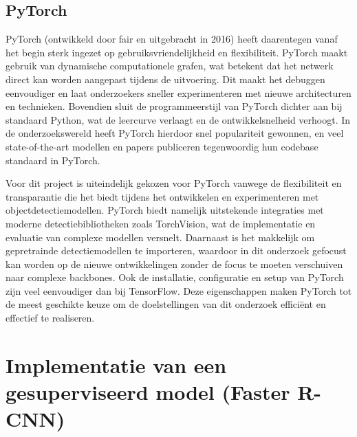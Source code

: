 \subsection{PyTorch}

PyTorch (ontwikkeld door \gls{fair} en uitgebracht in 2016) heeft daarentegen vanaf het begin sterk ingezet op gebruiksvriendelijkheid en flexibiliteit. PyTorch maakt gebruik van dynamische computationele grafen, wat betekent dat het netwerk direct kan worden aangepast tijdens de uitvoering. Dit maakt het debuggen eenvoudiger en laat onderzoekers sneller experimenteren met nieuwe architecturen en technieken. Bovendien sluit de programmeerstijl van PyTorch dichter aan bij standaard Python, wat de leercurve verlaagt en de ontwikkelsnelheid verhoogt. In de onderzoekswereld heeft PyTorch hierdoor snel populariteit gewonnen, en veel state-of-the-art modellen en papers publiceren tegenwoordig hun codebase standaard in PyTorch.

Voor dit project is uiteindelijk gekozen voor PyTorch vanwege de flexibiliteit en transparantie die het biedt tijdens het ontwikkelen en experimenteren met objectdetectiemodellen. PyTorch biedt namelijk uitstekende integraties met moderne detectiebibliotheken zoals TorchVision, wat de implementatie en evaluatie van complexe modellen versnelt. Daarnaast is het makkelijk om gepretrainde detectiemodellen te importeren, waardoor in dit onderzoek gefocust kan worden op de nieuwe ontwikkelingen zonder de focus te moeten verschuiven naar complexe backbones. Ook de installatie, configuratie en setup van PyTorch zijn veel eenvoudiger dan bij TensorFlow. Deze eigenschappen maken PyTorch tot de meest geschikte keuze om de doelstellingen van dit onderzoek efficiënt en effectief te realiseren.

\section{Implementatie van een gesuperviseerd model (Faster R-CNN)}

